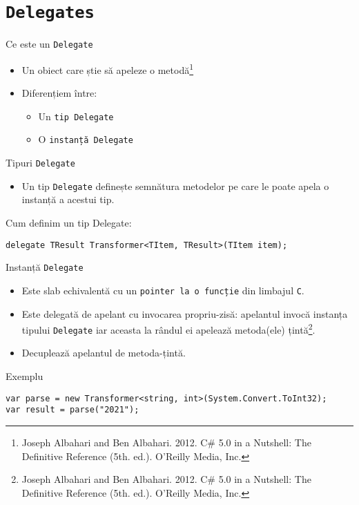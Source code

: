 \documentclass[presentation]{beamer}
\begin{document}
\section{\texttt{Delegates}}
\label{sec:orgdfe70f2}
\begin{frame}[label={sec:org7bc49a7},fragile]{Ce este un \texttt{Delegate}}
 \begin{itemize}
\item Un obiect care știe să apeleze o metodă\footnote{Joseph Albahari and Ben Albahari. 2012. C\# 5.0 in a Nutshell: The Definitive Reference (5th. ed.). O’Reilly Media, Inc.}
\item Diferențiem între:
\begin{itemize}
\item Un \texttt{tip Delegate}
\item O \texttt{instanță Delegate}
\end{itemize}
\end{itemize}
\end{frame}
\begin{frame}[label={sec:org598a118},fragile]{Tipuri \texttt{Delegate}}
 \begin{itemize}
\item Un tip \texttt{Delegate} definește semnătura metodelor pe care le poate apela o instanță a acestui tip.
\end{itemize}
\begin{block}{Cum definim un tip Delegate:}
\begin{verbatim}
delegate TResult Transformer<TItem, TResult>(TItem item);
\end{verbatim}
\end{block}
\end{frame}
\begin{frame}[label={sec:orgcac4f3f},fragile]{Instanță \texttt{Delegate}}
 \begin{itemize}
\item Este \alert{slab echivalentă} cu un \texttt{pointer la o funcție} din limbajul \texttt{C}.
\item Este delegată de apelant cu invocarea propriu-zisă: apelantul invocă instanța tipului \texttt{Delegate} iar aceasta la rândul ei apelează metoda(ele) țintă\footnote{Joseph Albahari and Ben Albahari. 2012. C\# 5.0 in a Nutshell: The Definitive Reference (5th. ed.). O’Reilly Media, Inc.}.
\item Decuplează apelantul de metoda-țintă.
\end{itemize}
\begin{block}{Exemplu}
\begin{verbatim}
var parse = new Transformer<string, int>(System.Convert.ToInt32);
var result = parse("2021");
\end{verbatim}
\end{block}
\end{frame}
\end{document}
